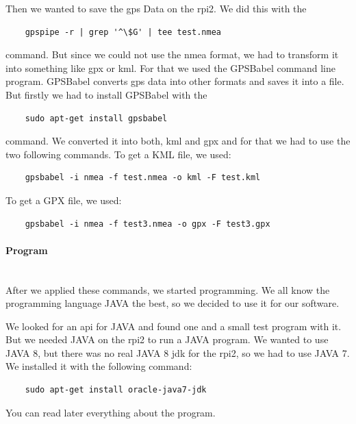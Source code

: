 \newline
Then we wanted to save the \gls{gps} Data on the \gls{rpi2}. We did this with the 
\begin{verbatim}
	gpspipe -r | grep '^\$G' | tee test.nmea 
\end{verbatim}
command.
But since we could not use the \gls{nmea} format, we had to transform it into something like \gls{gpx} or \gls{kml}. For that we used the GPSBabel command line program. GPSBabel converts \gls{gps} data into other formats and saves it into a file. But firstly we had to install GPSBabel with the 
\begin{verbatim}
	sudo apt-get install gpsbabel 
\end{verbatim}
command. We converted it into both, \gls{kml} and \gls{gpx} and for that we had to use the two following commands.
To get a KML file, we used:
\begin{verbatim}
	gpsbabel -i nmea -f test.nmea -o kml -F test.kml
\end{verbatim}
To get a GPX file, we used:
\begin{verbatim}
	gpsbabel -i nmea -f test3.nmea -o gpx -F test3.gpx
\end{verbatim}
\paragraph{Program} \mbox{}\\
After we applied these commands, we started programming. We all know the programming language JAVA the best, so we decided to use it for our software.  

We looked for an \gls{api} for JAVA and found one and a small test program with it. \newline
But we needed JAVA on the \gls{rpi2} to run a JAVA program. We wanted to use JAVA 8, but there was no real JAVA 8 \gls{jdk} for the \gls{rpi2}, so we had to use JAVA 7. We installed it with the following command:
\begin{verbatim}
	sudo apt-get install oracle-java7-jdk
\end{verbatim}
You can read later everything about the program.

